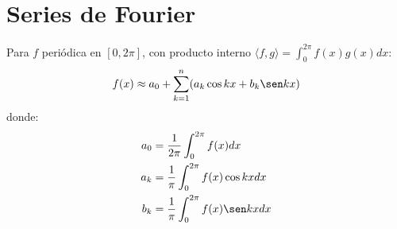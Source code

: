 \section{Series de Fourier}

\begin{definition}
Para $f$ periódica en $[0, 2\pi]$, con producto interno $\langle f, g \rangle = \int_0^{2\pi} f(x) g(x)  dx$:
\[
f(x) \approx a_0 + \sum_{k=1}^n (a_k \cos kx + b_k \sen kx)
\]
donde:
\begin{align*}
a_0 &= \frac{1}{2\pi} \int_0^{2\pi} f(x)  dx \\
a_k &= \frac{1}{\pi} \int_0^{2\pi} f(x) \cos kx  dx \\
b_k &= \frac{1}{\pi} \int_0^{2\pi} f(x) \sen kx  dx
\end{align*}
\end{definition}

